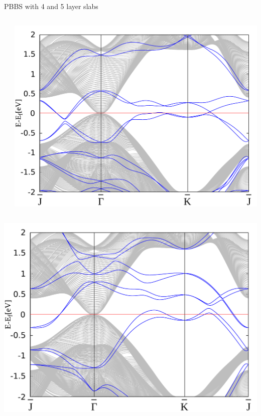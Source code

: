 \begin{frame}{PBBS with 4 and 5 layer slabs}
\begin{columns}
\begin{column}{.34\linewidth}
		\end{column}
		\begin{column}{.34\linewidth}
			\centering
			\includegraphics[width=\linewidth]{Hg_termination/no_H_bulk+5_layers_no_dos_-2_2.pdf}
		\end{column}
	\end{columns}
	\begin{columns}
		\begin{column}{.34\linewidth}
			\centering
			\includegraphics[width=\linewidth]{Te_and_Hg_termination/bulk+4_layers_no_dos_-2_2.pdf}

\end{column}
\end{columns}
\end{frame}
